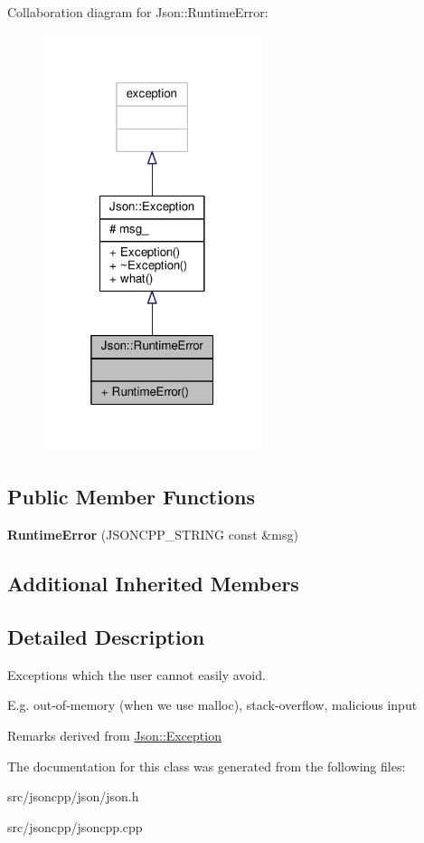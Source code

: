 Collaboration diagram for Json\+:\+:Runtime\+Error\+:
\nopagebreak
\begin{figure}[H]
\begin{center}
\leavevmode
\includegraphics[width=181pt]{d7/d3e/classJson_1_1RuntimeError__coll__graph}
\end{center}
\end{figure}
\subsection*{Public Member Functions}
\begin{DoxyCompactItemize}
\item 
{\bfseries Runtime\+Error} (J\+S\+O\+N\+C\+P\+P\+\_\+\+S\+T\+R\+I\+NG const \&msg)\hypertarget{classJson_1_1RuntimeError_a0f6445dc345ce0a703610b6e893fee40}{}\label{classJson_1_1RuntimeError_a0f6445dc345ce0a703610b6e893fee40}

\end{DoxyCompactItemize}
\subsection*{Additional Inherited Members}


\subsection{Detailed Description}
Exceptions which the user cannot easily avoid.

E.\+g. out-\/of-\/memory (when we use malloc), stack-\/overflow, malicious input

\begin{DoxyRemark}{Remarks}
derived from \hyperlink{classJson_1_1Exception}{Json\+::\+Exception} 
\end{DoxyRemark}


The documentation for this class was generated from the following files\+:\begin{DoxyCompactItemize}
\item 
src/jsoncpp/json/json.\+h\item 
src/jsoncpp/jsoncpp.\+cpp\end{DoxyCompactItemize}
